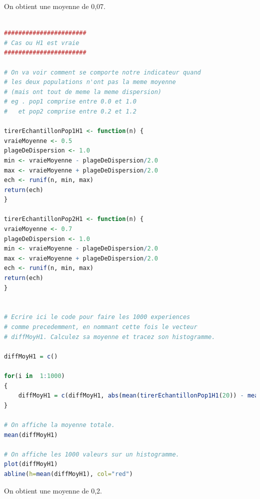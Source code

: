 On obtient une moyenne de 0,07.

\begin{lstlisting}[language=R]

#######################
# Cas ou H1 est vraie 
####################### 

# On va voir comment se comporte notre indicateur quand 
# les deux populations n'ont pas la meme moyenne
# (mais ont tout de meme la meme dispersion)
# eg . pop1 comprise entre 0.0 et 1.0
#   et pop2 comprise entre 0.2 et 1.2 

tirerEchantillonPop1H1 <- function(n) {
vraieMoyenne <- 0.5
plageDeDispersion <- 1.0
min <- vraieMoyenne - plageDeDispersion/2.0
max <- vraieMoyenne + plageDeDispersion/2.0
ech <- runif(n, min, max)
return(ech)
}

tirerEchantillonPop2H1 <- function(n) {
vraieMoyenne <- 0.7
plageDeDispersion <- 1.0
min <- vraieMoyenne - plageDeDispersion/2.0
max <- vraieMoyenne + plageDeDispersion/2.0
ech <- runif(n, min, max)
return(ech)
}


# Ecrire ici le code pour faire les 1000 experiences 
# comme precedemment, en nommant cette fois le vecteur
# diffMoyH1. Calculez sa moyenne et tracez son histogramme.

diffMoyH1 = c()

for(i in  1:1000)
{
	diffMoyH1 = c(diffMoyH1, abs(mean(tirerEchantillonPop1H1(20)) - mean(tirerEchantillonPop2H1(20))))
}

# On affiche la moyenne totale.
mean(diffMoyH1)

# On affiche les 1000 valeurs sur un histogramme.
plot(diffMoyH1)
abline(h=mean(diffMoyH1), col="red")

\end{lstlisting}

On obtient une moyenne de 0,2.

